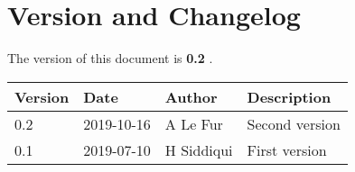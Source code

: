 \section{Version and Changelog}

The version of this document is {\bf 0.2} .

\begin{table}[H]
    \begin{tabular}{|l|l|l|p{10cm}| }
    \hline
    {\bf Version} & {\bf Date} & {\bf Author} & {\bf Description} \\ \hline
    0.2 & 2019-10-16 & A Le Fur & Second version \\ \hline
    0.1 & 2019-07-10 & H Siddiqui & First version \\ \hline
    \end{tabular}
\end{table}

